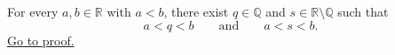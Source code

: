\begin{corollary}
\label{cor:every-open-interval-contains-rational-and-irrational}
For every $a,b\in\mathbb{R}$ with $a<b$, there exist
$q\in\mathbb{Q}$ and $s\in\mathbb{R}\setminus\mathbb{Q}$ such that
\[
  a<q<b
  \qquad\text{and}\qquad
  a<s<b.
\]
\hyperref[prf:every-open-interval-contains-rational-and-irrational]{Go to proof.}
\end{corollary}